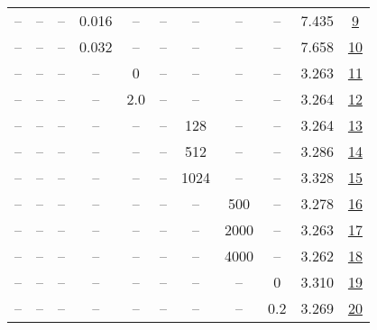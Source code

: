 \begin{table}[H]
\begin{tabular}{ccccccccccc}
-- & -- & -- & 0.016 & -- & -- & -- & -- & -- & 7.435 & \href{https://wandb.ai/stanford-mercury/optimizer-scaling/runs/sweep-130m-21B-adamw06731clr0.016-wd0.1-minlr0-warmup1000-b10.9--2664a6}{9} \\
-- & -- & -- & 0.032 & -- & -- & -- & -- & -- & 7.658 & \href{https://wandb.ai/stanford-mercury/optimizer-scaling/runs/sweep-130m-21B-adamweac049lr0.032-wd0.1-minlr0-warmup1000-b10.9--cbb38e}{10} \\
-- & -- & -- & -- & 0 & -- & -- & -- & -- & 3.263 & \href{https://wandb.ai/stanford-mercury/optimizer-scaling/runs/sweep-130m-21B-adamw9268cblr0.008-wd0.1-minlr0-warmup1000-b10.9--c4bf52}{11} \\
-- & -- & -- & -- & 2.0 & -- & -- & -- & -- & 3.264 & \href{https://wandb.ai/stanford-mercury/optimizer-scaling/runs/sweep-130m-21B-adamwf884c5lr0.008-wd0.1-minlr0-warmup1000-b10.9--bf87fc}{12} \\
-- & -- & -- & -- & -- & -- & 128 & -- & -- & 3.264 & \href{https://wandb.ai/stanford-mercury/optimizer-scaling/runs/sweep-130m-21B-adamw292ad2lr0.008-wd0.1-minlr0-warmup1000-b10.9--b88aa1}{13} \\
-- & -- & -- & -- & -- & -- & 512 & -- & -- & 3.286 & \href{https://wandb.ai/stanford-mercury/optimizer-scaling/runs/sweep-130m-21B-adamwdb2f8blr0.008-wd0.1-minlr0-warmup1000-b10.9--849bed}{14} \\
-- & -- & -- & -- & -- & -- & 1024 & -- & -- & 3.328 & \href{https://wandb.ai/stanford-mercury/optimizer-scaling/runs/sweep-130m-21B-adamwe4d6f6lr0.008-wd0.1-minlr0-warmup1000-b10.9--f0487d}{15} \\
-- & -- & -- & -- & -- & -- & -- & 500 & -- & 3.278 & \href{https://wandb.ai/stanford-mercury/optimizer-scaling/runs/sweep-130m-21B-adamw479b6elr0.008-wd0.1-minlr0-warmup500-b10.9-b-5842d3}{16} \\
-- & -- & -- & -- & -- & -- & -- & 2000 & -- & 3.263 & \href{https://wandb.ai/stanford-mercury/optimizer-scaling/runs/sweep-130m-21B-adamw28a1ddlr0.008-wd0.1-minlr0-warmup2000-b10.9--b21aed}{17} \\
-- & -- & -- & -- & -- & -- & -- & 4000 & -- & 3.262 & \href{https://wandb.ai/stanford-mercury/optimizer-scaling/runs/sweep-130m-21B-adamwb9e54alr0.008-wd0.1-minlr0-warmup4000-b10.9--74889b}{18} \\
-- & -- & -- & -- & -- & -- & -- & -- & 0 & 3.310 & \href{https://wandb.ai/stanford-mercury/optimizer-scaling/runs/sweep-130m-21B-adamw549010lr0.008-wd0-minlr0-warmup1000-b10.9-b2-c08f03}{19} \\
-- & -- & -- & -- & -- & -- & -- & -- & 0.2 & 3.269 & \href{https://wandb.ai/stanford-mercury/optimizer-scaling/runs/sweep-130m-21B-adamwe72844lr0.008-wd0.2-minlr0-warmup1000-b10.9--2b5e04}{20} \\
\bottomrule
\end{tabular}
\end{table}

